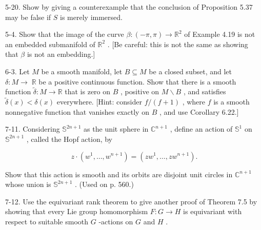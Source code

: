 \begin{exercise}
\label{prob:5-20}


5-20. Show by giving a counterexample that the conclusion of Proposition 5.37 may be false if $S$ is merely immersed.
\end{exercise}

\begin{exercise}
\label{prob:5-4}


5-4. Show that the image of the curve $\beta  : \left( {-\pi ,\pi }\right)  \rightarrow  {\mathbb{R}}^{2}$ of Example 4.19 is not an embedded submanifold of ${\mathbb{R}}^{2}$ . [Be careful: this is not the same as showing that $\beta$ is not an embedding.]
\end{exercise}

\begin{exercise}
\label{prob:6-3}


6-3. Let $M$ be a smooth manifold, let $B \subseteq  M$ be a closed subset, and let $\delta  : M \rightarrow \; \mathbb{R}$ be a positive continuous function. Show that there is a smooth function $\widetilde{\delta } : M \rightarrow  \mathbb{R}$ that is zero on $B$ , positive on $M \smallsetminus  B$ , and satisfies $\widetilde{\delta }\left( x\right)  < \delta \left( x\right)$ everywhere. [Hint: consider $f/\left( {f + 1}\right)$ , where $f$ is a smooth nonnegative function that vanishes exactly on $B$ , and use Corollary 6.22.]
\end{exercise}

\begin{exercise}
\label{prob:7-11}


7-11. Considering ${\mathbb{S}}^{{2n} + 1}$ as the unit sphere in ${\mathbb{C}}^{n + 1}$ , define an action of ${\mathbb{S}}^{1}$ on ${\mathbb{S}}^{{2n} + 1}$ , called the Hopf action, by

\[
z \cdot  \left( {{w}^{1},\ldots ,{w}^{n + 1}}\right)  = \left( {z{w}^{1},\ldots , z{w}^{n + 1}}\right) .
\]

Show that this action is smooth and its orbits are disjoint unit circles in ${\mathbb{C}}^{n + 1}$ whose union is ${\mathbb{S}}^{{2n} + 1}$ . (Used on p. 560.)
\end{exercise}

\begin{exercise}
\label{prob:7-12}


7-12. Use the equivariant rank theorem to give another proof of Theorem 7.5 by showing that every Lie group homomorphism $F : G \rightarrow  H$ is equivariant with respect to suitable smooth $G$ -actions on $G$ and $H$ .
\end{exercise}

